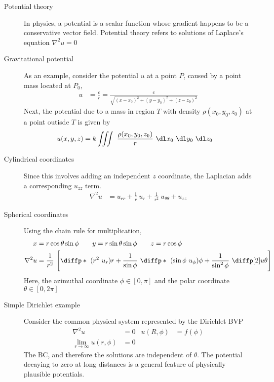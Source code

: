 \begin{description}
    \item[Potential theory] In physics, a potential is a scalar function whose gradient
        happens to be a conservative vector field. Potential theory refers to solutions
        of Laplace's equation $ \nabla^2 u  = 0$

    \item[Gravitational potential] As an example, consider the potential $ u $ at a point
        $ P $, caused by a point mass located at $ P_0 $,
        \begin{align}
            u & = \frac{c}{r} = \frac{c}{\sqrt{(x - x_0)^2 + (y - y_0)^2 + (z - z_0)^2}}
        \end{align}
        Next, the potential due to a mass in region $ T $ with density
        $ \rho(x_0, y_0, z_0) $ at a point outisde $ T $ is given by
        \begin{align}
            u(x, y, z) & = k\iiint\ \frac{\rho(x_0, y_0, z_0)}{r}\ \dl x_0\ \dl y_0
            \ \dl z_0
        \end{align}

    \item[Cylindrical coordinates] Since this involves adding an independent $ z $
        coordinate, the Laplacian adds a corresponding $ u_{zz} $ term.
        \begin{align}
            \nabla^2 u & = u_{rr} + \frac{1}{r}\ u_r + \frac{1}{r^2}\ u_{\theta\theta}
            + u_{zz}
        \end{align}

    \item[Spherical coordinates] Using the chain rule for multiplication,
        \begin{align}
            x          & = r\cos\theta\sin\phi \qquad y = r\sin\theta\sin\phi
            \qquad z = r\cos\phi                                              \\
            \nabla^2 u & = \frac{1}{r^2}\ \Bigg[ \diffp*{\ (r^2\ u_r)}{r}
                + \frac{1}{\sin\phi}\ \diffp*{\ (\sin\phi\ u_\phi)}{\phi}
                + \frac{1}{\sin^2\phi}\ \diffp[2]u\theta\Bigg]
        \end{align}
        Here, the azimuthal coordinate $ \phi \in [0, \pi] $ and the polar coordinate
        $ \theta \in [0, 2\pi] $

    \item[Simple Dirichlet example] Consider the common physical system represented
        by the Dirichlet BVP
        \begin{align}
            \nabla^2 u                     & = 0 & u(R, \phi) & = f(\phi) \\
            \lim_{r \to \infty} u(r, \phi) & = 0
        \end{align}
        The BC, and therefore the solutions are independent of $ \theta $. The potential
        decaying to zero at long distances is a general feature of physically plausible
        potentials.


\end{description}

